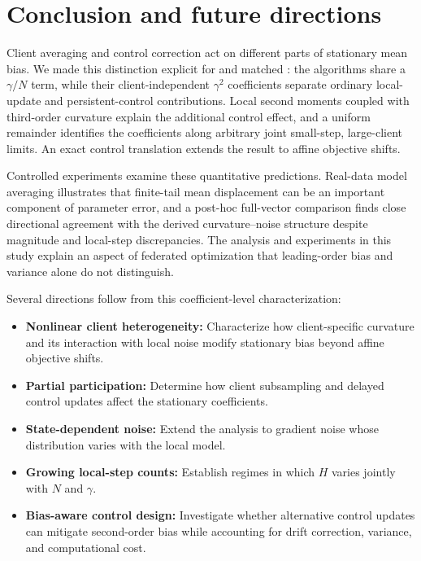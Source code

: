 \section{Conclusion and future directions}
\label{sec:conclusion}

Client averaging and control correction act on different parts of stationary mean bias. We made this distinction explicit for \Scaf{} and matched \FedAvg{}: the algorithms share a $\gamma/N$ term, while their client-independent $\gamma^2$ coefficients separate ordinary local-update and persistent-control contributions. Local second moments coupled with third-order curvature explain the additional control effect, and a uniform remainder identifies the coefficients along arbitrary joint small-step, large-client limits. An exact control translation extends the \Scaf{} result to affine objective shifts.

Controlled experiments examine these quantitative predictions. Real-data model
averaging illustrates that finite-tail mean displacement can be an important
component of parameter error, and a post-hoc full-vector comparison finds
close directional agreement with the derived curvature--noise structure despite
magnitude and local-step discrepancies. The analysis and experiments in this study explain an aspect of federated optimization that leading-order bias and
variance alone do not distinguish.

Several directions follow from this coefficient-level characterization:
\begin{itemize}
    \item \textbf{Nonlinear client heterogeneity:} Characterize how client-specific
    curvature and its interaction with local noise modify stationary bias
    beyond affine objective shifts.
    \item \textbf{Partial participation:} Determine how client subsampling and
    delayed control updates affect the stationary coefficients.
    \item \textbf{State-dependent noise:} Extend the analysis to gradient noise
    whose distribution varies with the local model.
    \item \textbf{Growing local-step counts:} Establish regimes in which $H$
    varies jointly with $N$ and $\gamma$.
    \item \textbf{Bias-aware control design:} Investigate whether alternative
    control updates can mitigate second-order bias while accounting for
    drift correction, variance, and computational cost.
\end{itemize}